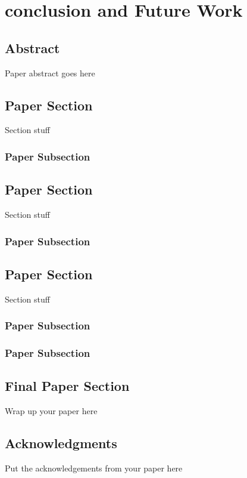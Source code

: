 \chapter{conclusion and Future Work}
\label{Chapter7}
\large {





\section*{Abstract}
Paper abstract goes here
\section{Paper Section}
Section stuff

\subsection{Paper Subsection}
\section{Paper Section}
Section stuff

\subsection{Paper Subsection}
\section{Paper Section}
Section stuff

\subsection{Paper Subsection}

\subsection{Paper Subsection}
\section{Final Paper Section}
Wrap up your paper here

\section*{Acknowledgments}
Put the acknowledgements from your paper here









}
